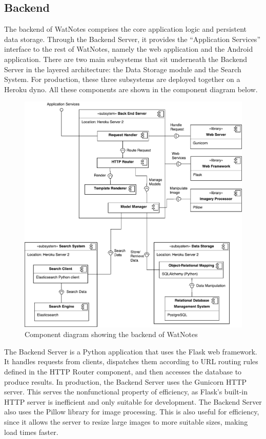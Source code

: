 \documentclass[12pt]{article}
\begin{document}
  \subsection{Backend}
    The backend of WatNotes comprises the core application logic and persistent
    data storage. Through the Backend Server, it provides the ``Application
    Services'' interface to the rest of WatNotes, namely the web application
    and the Android application. There are two main subsystems that sit
    underneath the Backend Server in the layered architecture: the Data Storage
    module and the Search System. For production, these three subsystems are
    deployed together on a Heroku dyno. All these components are shown in the
    component diagram below.

    \begin{figure}[H]
      \includegraphics[width=\textwidth]{assets/backend-component.pdf}
      \caption{Component diagram showing the backend of WatNotes}
    \end{figure}

    The Backend Server is a Python application that uses the Flask web
    framework. It handles requests from clients, dispatches them according to
    URL routing rules defined in the HTTP Router component, and then accesses
    the database to produce results. In production, the Backend Server uses the
    Gunicorn HTTP server. This serves the nonfunctional property of efficiency,
    as Flask's built-in HTTP server is inefficient and only suitable for
    development. The Backend Server also uses the Pillow library for image
    processing. This is also useful for efficiency, since it allows the server
    to resize large images to more suitable sizes, making load times faster.\\
\end{document}
